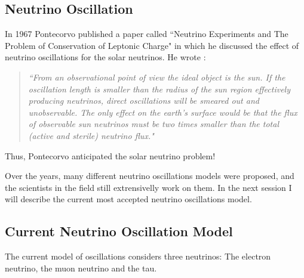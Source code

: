 \subsection{Neutrino Oscillation}

In 1967 Pontecorvo published a paper called ``Neutrino Experiments and The Problem of Conservation of Leptonic Charge" in which he discussed the effect of neutrino oscillations for the solar neutrinos. He wrote \cite{pontecorvo_1967}: 
\begin{quote}
\emph{``From an observational point of view the ideal object is the sun. If the oscillation length is smaller than the radius of the sun region effectively producing neutrinos, direct oscillations will be smeared out and unobservable. The only effect on the earth’s surface would be that the flux of observable sun neutrinos must be two times smaller than the total (active and sterile) neutrino flux."}
\end{quote}
%
Thus, Pontecorvo anticipated the solar neutrino problem!

Over the years, many different neutrino oscillations models were proposed, and the scientists in the field still extrensivelly work on them. In the next session I will describe the current most accepted neutrino oscillations model. 

\subsection{Current Neutrino Oscillation Model}

The current model of oscillations considers three neutrinos: The electron neutrino, the muon neutrino and the tau.

